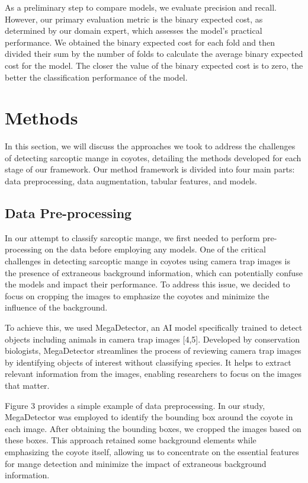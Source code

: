 \documentclass{article}
\begin{document}
As a preliminary step to compare models, we evaluate precision and recall. However, our primary evaluation metric is the binary expected cost, as determined by our domain expert, which assesses the model's practical performance. We obtained the binary expected cost for each fold and then divided their sum by the number of folds to calculate the average binary expected cost for the model. The closer the value of the binary expected cost is to zero, the better the classification performance of the model.

\section{Methods}
In this section, we will discuss the approaches we took to address the challenges of detecting sarcoptic mange in coyotes, detailing the methods developed for each stage of our framework. Our method framework is divided into four main parts: data preprocessing, data augmentation, tabular features, and models.

\subsection{Data Pre-processing}
In our attempt to classify sarcoptic mange, we first needed to perform pre-processing on the data before employing any models. One of the critical challenges in detecting sarcoptic mange in coyotes using camera trap images is the presence of extraneous background information, which can potentially confuse the models and impact their performance. To address this issue, we decided to focus on cropping the images to emphasize the coyotes and minimize the influence of the background.

To achieve this, we used MegaDetector, an AI model specifically trained to detect objects including animals in camera trap images [4,5]. Developed by conservation biologists, MegaDetector streamlines the process of reviewing camera trap images by identifying objects of interest without classifying species. It helps to extract relevant information from the images, enabling researchers to focus on the images that matter.

Figure 3 provides a simple example of data preprocessing. In our study, MegaDetector was employed to identify the bounding box around the coyote in each image. After obtaining the bounding boxes, we cropped the images based on these boxes. This approach retained some background elements while emphasizing the coyote itself, allowing us to concentrate on the essential features for mange detection and minimize the impact of extraneous background information.
\end{document}
